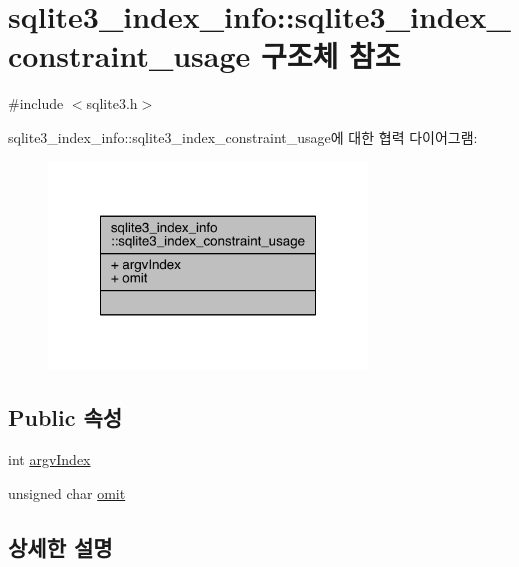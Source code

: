 \hypertarget{structsqlite3__index__info_1_1sqlite3__index__constraint__usage}{}\section{sqlite3\+\_\+index\+\_\+info\+:\+:sqlite3\+\_\+index\+\_\+constraint\+\_\+usage 구조체 참조}
\label{structsqlite3__index__info_1_1sqlite3__index__constraint__usage}


{\ttfamily \#include $<$sqlite3.\+h$>$}



sqlite3\+\_\+index\+\_\+info\+:\+:sqlite3\+\_\+index\+\_\+constraint\+\_\+usage에 대한 협력 다이어그램\+:
\nopagebreak
\begin{figure}[H]
\begin{center}
\leavevmode
\includegraphics[width=240pt]{structsqlite3__index__info_1_1sqlite3__index__constraint__usage__coll__graph}
\end{center}
\end{figure}
\subsection*{Public 속성}
\begin{DoxyCompactItemize}
\item 
int \hyperlink{structsqlite3__index__info_1_1sqlite3__index__constraint__usage_a2cbf680033c2937b3de226e091743a94}{argv\+Index}
\item 
unsigned char \hyperlink{structsqlite3__index__info_1_1sqlite3__index__constraint__usage_ad07fa17d30e4fb3abe23ceaf84edf0ef}{omit}
\end{DoxyCompactItemize}


\subsection{상세한 설명}


